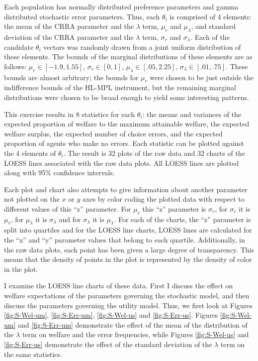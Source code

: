 \documentclass[../main.tex]{subfiles}
\begin{document}
Each population has normally distributed preference parameters and gamma distributed stochastic error parameters.
Thus, each $\theta_i$ is comprised of 4 elements: the mean of the CRRA parameter and the $\lambda$ term, $\mu_r$ and $\mu_\lambda$, and standard deviation of the CRRA parameter and the $\lambda$ term, $\sigma_r$ and $\sigma_\lambda$. Each of the candidate $\theta_i$ vectors was randomly drawn from a joint uniform distribution of these elements.
The bounds of the marginal distributions of these elements are as follows: $\mu_r \in [-1.9 , 1.55 ]$, $\sigma_r \in [0 , 1]$, $\mu_\lambda \in [.05 , 2.25]$, $\sigma_\lambda \in [.01 , .75]$.
These bounds are almost arbitrary; the bounds for $\mu_r$ were chosen to be just outside the indifference bounds of the HL-MPL instrument, but the remaining marginal distributions were chosen to be broad enough to yield some interesting patterns.

This exercise results in 8 statistics for each $\theta_i$: the means and variances of the expected proportion of welfare to the maximum attainable welfare, the expected welfare surplus, the expected number of choice errors, and the expected proportion of agents who make no errors.
Each statistic can be plotted against the 4 elements of $\theta_i$.
The result is 32 plots of the raw data and 32 charts of the LOESS lines associated with the raw data plots.
All LOESS lines are plotted along with 95\% confidence intervals.

Each plot and chart also attempts to give information about another parameter not plotted on the $x$ or $y$ axes by color coding the plotted data with respect to different values of this \enquote{z} parameter.
For $\mu_r$ this \enquote{z} parameter is $\sigma_r$, for $\sigma_r$ it is $\mu_r$, for $\mu_\lambda$ it is $\sigma_\lambda$ and for $\sigma_\lambda$ it is $\mu_\lambda$.
For each of the charts, the \enquote{z} parameter is split into quartiles and for the LOESS line charts, LOESS lines are calculated for the \enquote{x} and \enquote{y} parameter values that belong to each quartile.
Additionally, in the raw data plots, each point has been given a large degree of transparency.
This means that the density of points in the plot is represented by the density of color in the plot.

I examine the LOESS line charts of these data.
First I discuss the effect on welfare expectations of the parameters governing the stochastic model, and then discuss the parameters governing the utility model.
Thus, we first look at Figures \ref{fig:S-Wel-um}, \ref{fig:S-Err-um}, \ref{fig:S-Wel-us} and \ref{fig:S-Err-us}.
Figures \ref{fig:S-Wel-um} and \ref{fig:S-Err-um} demonstrate the effect of the mean of the distribution of the $\lambda$ term on welfare and the error frequencies, while Figures \ref{fig:S-Wel-us} and \ref{fig:S-Err-us} demonstrate the effect of the standard deviation of the $\lambda$ term on the same statistics.
\end{document}
